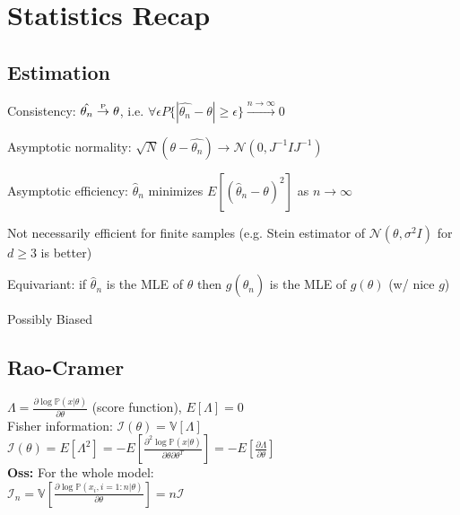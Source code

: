 \section{Statistics Recap}
\subsection*{Estimation}
\begin{inparaitem}[\color{red}\textbullet]
\item Consistency: $\hat{\theta_n} \stackrel{\text{\tiny P}}{\rightarrow} \theta$,
i.e. $\forall\epsilon P \{|\hat{\theta_n}-\theta| \geq\epsilon\} \stackrel{n \to\infty}{\longrightarrow} 0 $\\
\item Asymptotic normality: $\sqrt{N}(\theta - \hat{\theta_n}) \to \mathcal{N}(0, J^{-1}IJ^{-1})$ \\
\item Asymptotic efficiency: $\hat{\theta}_n$ minimizes $E[(\hat{\theta}_n-\theta)^2]$ as $n \to \infty$\\
\item Not necessarily efficient for finite samples (e.g.  Stein  estimator  of $\mathcal{N}(\theta,\sigma^2I)$ for $d \geq 3$ is better)\\
\item Equivariant:  if $\hat{\theta}_n$ is the MLE of $\theta$ then $g(\hat{\theta}_n)$ is the MLE of $g(\theta)$ (w/ nice $g$)\\
\item Possibly Biased
\end{inparaitem}

\subsection*{Rao-Cramer}
$\Lambda = \frac{\partial \log \mathbb{P}(x|\theta )}{\partial \theta}$ (score function), $E[\Lambda ]=0$\\
Fisher information: $\mathcal{I}(\theta)= \mathbb{V}[\Lambda]$ \\
$\mathcal{I}(\theta)= E[\Lambda^{2}]= -E[\frac{\partial^2 \log \mathbb{P}(x|\theta ) }{\partial \theta \partial \theta ^{T}}]= -E[\frac{\partial \Lambda}{\partial \theta}]$ \\
\textbf{Oss:} For the whole model:\\ $\mathcal{I}_n = \mathbb{V}\left[\frac{\partial \log \mathbb{P}(x_i, i=1:n|\theta )}{\partial \theta}\right]=n\mathcal{I}$

